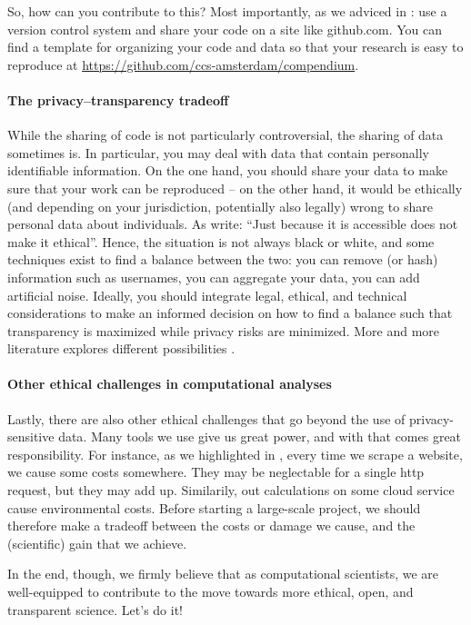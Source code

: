 So, how can you contribute to this? Most importantly, as we adviced in : use a version control system
and share your code on a site like github.com. You can find a template for organizing your code and data so that your
research is easy to reproduce at \url{https://github.com/ccs-amsterdam/compendium}. 

\paragraph{The privacy--transparency tradeoff} While the sharing of code is not particularly controversial, the sharing of
data sometimes is. In particular, you may deal with data that contain personally identifiable information. On the one
hand, you should share your data to make sure that your work can be reproduced -- on the other hand, it would be ethically
(and depending on your jurisdiction, potentially also legally) wrong to share personal data about individuals.
As \cite{boyd2012} write: ``Just because it is accessible does not make it ethical''. Hence, the
situation is not always black or white, and some techniques exist to find a balance between the two: you can remove
(or hash) information such as usernames, you can aggregate your data, you can add artificial noise. Ideally, you should
integrate legal, ethical, and technical considerations to make an informed decision on how to find a balance such that
transparency is maximized while privacy risks are minimized. More and more literature explores different possibilities \cite[e.g.][]{Breuer2020}.


\paragraph{Other ethical challenges in computational analyses} 
Lastly, there are also other ethical challenges that go beyond the use of privacy-sensitive data. Many tools we
use give us great power, and with that comes great responsibility. For instance, as we highlighted in
, every time we scrape a website, we cause some costs somewhere. They may be
neglectable for a single http request, but they may add up. Similarily, out calculations on some cloud service
cause environmental costs. Before starting a large-scale project, we should therefore make a tradeoff between
the costs or damage we cause, and the (scientific) gain that we achieve.

In the end, though, we firmly believe that as computational scientists, we are well-equipped to contribute to the move towards
more ethical, open, and transparent science. Let's do it!
